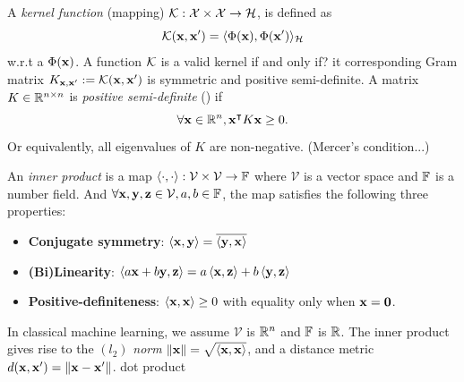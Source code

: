 \begin{definition}\label{def:kernel}
	A \emph{kernel function} (mapping) $\mathcal{K}: \mathcal{X}\times\mathcal{X}\to\mathcal{H}$,
	is defined as 
	\begin{equation}
		\mathcal{K}(\vb{x},\vb{x}') = \langle \Phi(\vb{x}),\Phi(\vb{x}') \rangle_{\mathcal{H}}
		\label{eq:kernel_classical}
	\end{equation}
	w.r.t a  $\Phi(\vb{x})$.
	A function $\mathcal{K}$ is a valid kernel if and only if? it corresponding Gram matrix $K_{\vb{x},\vb{x}'}:=\mathcal{K}(\vb{x},\vb{x}')$ is symmetric and positive semi-definite.
	A matrix $K\in\mathbb{R}^{n\times n}$ is \emph{positive semi-definite} (\psd) if
	\begin{equation}
		\forall \vb{x} \in \mathbb{R}^n, \vb{x}^\intercal K \vb{x} \ge 0.
	\end{equation}
	Or equivalently, all eigenvalues of $K$ are non-negative. (Mercer's condition...)
\end{definition}
\begin{definition}\label{def:inner_product}
	An \emph{inner product} is a map
	$\expval{\cdot,\cdot}: \mathcal{V} \times \mathcal{V} \to \mathbb{F}$
	where $\mathcal{V}$ is a vector space and $\mathbb{F}$ is a number field.
	And $\forall \vb{x},\vb{y},\vb{z}\in \mathcal{V},a,b\in\mathbb{F}$, 
	the map satisfies the following three properties:
	\begin{itemize}
		\item \textbf{Conjugate symmetry}:
		$\expval{\vb{x},\vb{y}}=\overline{\expval{\vb{y},\vb{x}}}$
		\item \textbf{(Bi)Linearity}:
		$\expval{a\vb{x}+b\vb{y},\vb{z}}=a\expval{\vb{x},\vb{z}}+b\expval{\vb{y},\vb{z}}$
		\item \textbf{Positive-definiteness}:
		$\expval{\vb{x},\vb{x}}\ge 0$ with equality only when $\vb{x}=\vb{0}$.
	\end{itemize}
	In classical machine learning, we assume $\mathcal{V}$ is $\mathbb{R}^n$ and $\mathbb{F}$ is $\mathbb{R}$.
	The inner product gives rise to the $(l_2)$ \emph{norm} $\norm{\vb{x}}=\sqrt{\expval{\vb{x},\vb{x}}}$,
	and a distance metric $d(\vb{x},\vb{x}')=\norm{\vb{x}-\vb{x}'}$.
	dot product
\end{definition}
